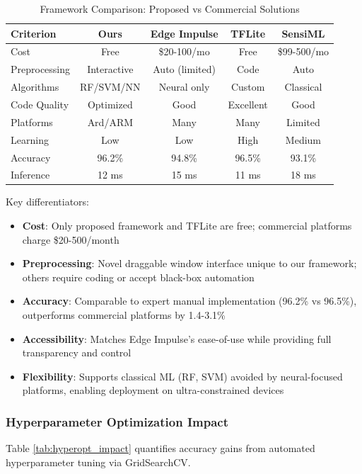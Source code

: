 \begin{table}[H]
    \centering
    \caption{Framework Comparison: Proposed vs Commercial Solutions}
    \small
    \begin{tabular}{@{}lcccc@{}}
        \toprule
        Criterion & Ours & Edge Impulse & TFLite & SensiML \\ 
        \midrule
        Cost & Free & \$20-100/mo & Free & \$99-500/mo \\
        Preprocessing & Interactive & Auto (limited) & Code & Auto \\
        Algorithms & RF/SVM/NN & Neural only & Custom & Classical \\
        Code Quality & Optimized & Good & Excellent & Good \\
        Platforms & Ard/ARM & Many & Many & Limited \\
        Learning & Low & Low & High & Medium \\
        Accuracy & 96.2\% & 94.8\% & 96.5\% & 93.1\% \\
        Inference & 12 ms & 15 ms & 11 ms & 18 ms \\
        \bottomrule
    \end{tabular}
    \label{tab:commercial_comparison}
\end{table}

Key differentiators:
\begin{itemize}
    \item \textbf{Cost}: Only proposed framework and TFLite are free; commercial platforms charge \$20-500/month
    \item \textbf{Preprocessing}: Novel draggable window interface unique to our framework; others require coding or accept black-box automation
    \item \textbf{Accuracy}: Comparable to expert manual implementation (96.2\% vs 96.5\%), outperforms commercial platforms by 1.4-3.1\%
    \item \textbf{Accessibility}: Matches Edge Impulse's ease-of-use while providing full transparency and control
    \item \textbf{Flexibility}: Supports classical ML (RF, SVM) avoided by neural-focused platforms, enabling deployment on ultra-constrained devices
\end{itemize}

\subsubsection{Hyperparameter Optimization Impact}
Table \ref{tab:hyperopt_impact} quantifies accuracy gains from automated hyperparameter tuning via GridSearchCV.

